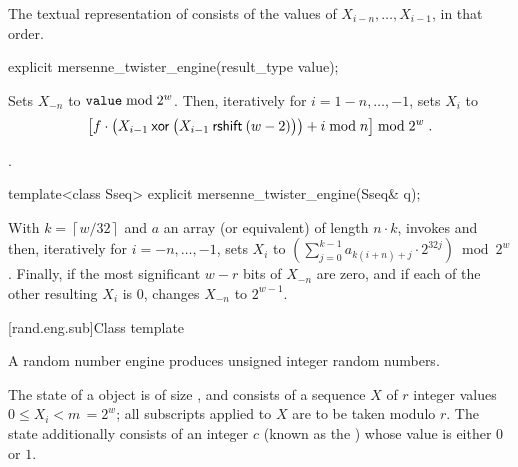 \pnum
The textual representation
of 
consists of the values of $X_{i - n}, \dotsc, X_{i - 1}$,
in that order.

%
\begin{itemdecl}
explicit mersenne_twister_engine(result_type value);
\end{itemdecl}

\begin{itemdescr}
\pnum
\effects
Sets $X_{-n}$ to $\tcode{value} \bmod 2^w$.
Then, iteratively for $i = 1 - n, \dotsc, -1$, sets $X_i$ to
\[%
 \bigl[f \cdot
       \bigl(X_{i-1} \xor \bigl(X_{i-1} \rightshift (w-2)\bigr)
       \bigr)
       + i \bmod n
 \bigr] \bmod 2^w
\; \mbox{.}
\]%

\pnum
\complexity
{}.
\end{itemdescr}

%
\begin{itemdecl}
template<class Sseq> explicit mersenne_twister_engine(Sseq& q);
\end{itemdecl}

\begin{itemdescr}
\pnum
\effects
 With
 $k = \left\lceil w / 32 \right\rceil$
 and $a$ an array (or equivalent)
 of length $n \cdot k$,
 invokes 
 and then, iteratively for $i = -n,\dotsc,-1$,
 sets $X_i$
 to $\left(\sum_{j=0}^{k-1}a_{k(i+n)+j} \cdot 2^{32j} \right) \bmod 2^w$.
 Finally,
 if the most significant $w-r$ bits of $X_{-n}$
 are zero,
 and if each of the other resulting $X_i$ is $0$,
 changes $X_{-n}$
 to $ 2^{w-1} $.
\end{itemdescr}


[rand.eng.sub]{Class template }%
%

\pnum
A  random number engine
produces unsigned integer random numbers.

\pnum
The state 
of a  object 
is of size
,
and consists of
a sequence $X$ of $r$ integer values $0 \leq X_i < m \,= 2^w$;
all subscripts applied to $X$ are to be taken modulo $r$.
The state 
additionally consists of an integer $c$
(known as the )
whose value is either $0$ or $1$.

